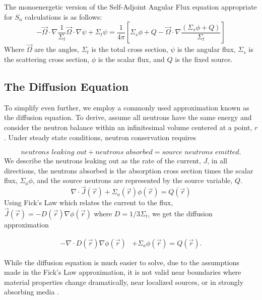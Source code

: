 The monoenergetic version of the Self-Adjoint Angular Flux equation appropriate for $S_n$ calculations is as follows:
\begin{equation}
    - \vec{\Omega} \cdot \nabla \frac{1}{\Sigma_t}\vec{\Omega} \cdot \nabla \psi + \Sigma_t \psi = \frac{1}{4\pi}[\Sigma_s\phi + Q - \vec{\Omega} \cdot \nabla \frac{(\Sigma_s\phi + Q)}{\Sigma_t}]
    \label{eq:SAAF}
\end{equation}
Where $\vec{\Omega}$ are the angles, $\Sigma_t$ is the total cross section, $\psi$ is the angular flux, $\Sigma_s$ is the scattering cross section, $\phi$ is the scalar flux, and $Q$ is the fixed source.


\subsection{The Diffusion Equation}
To simplify even further, we employ a commonly used approximation known as the diffusion equation. To derive, assume all neutrons have the same energy and consider the neutron balance within an infinitesimal volume centered at a point, $r$. Under steady state conditions, neutron conservation requires

\begin{equation}
    \textit{neutrons leaking out} + \textit{neutrons absorbed} = \textit{source neutrons emitted}.
\end{equation}
We describe the neutrons leaking out as the rate of the current, $J$, in all directions, the neutrons absorbed is the absorption cross section times the scalar flux, $\Sigma_a\phi$, and the source neutrons are represented by the source variable, $Q$. 
\begin{equation}
    \nabla\cdot \vec{J}(\vec{r}) + \Sigma_a(\vec{r})\phi(\vec{r}) = Q(\vec{r})
\end{equation}
Using Fick's Law which relates the current to the flux, $\vec{J}(\vec{r}) = -D(\vec{r})\nabla\phi(\vec{r})$ where $D = 1/3\Sigma_t$, we get the diffusion approximation

\begin{equation}
\begin{split}
 - \nabla \cdot D(\vec{r})\nabla\phi(\vec{r}) &+ \Sigma_a \phi(\vec{r}) = Q(\vec{r}).
\end{split}
\label{eq:diffusion_fixed_source}
\end{equation}

While the diffusion equation is much easier to solve, due to the assumptions made in the Fick's Law approximation, it is not valid near boundaries where material properties change dramatically, near localized sources, or in strongly absorbing media \cite{lewis-miller}.

